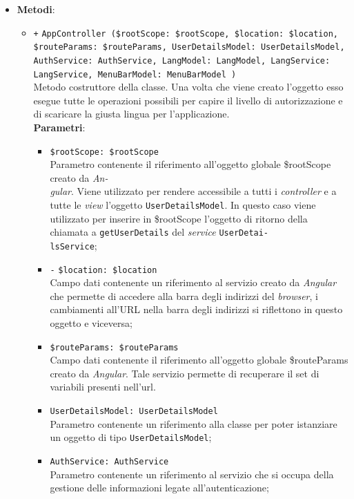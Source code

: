 \begin{itemize}
\begin{itemize}
	\end{itemize}	
		\item \textbf{Metodi}:
		\begin{itemize}
		\item \texttt{+} \texttt{AppController (\$rootScope: \$rootScope, \$location: \$location, \$routeParams: \$routeParams, UserDetailsModel: UserDetailsModel, AuthService: AuthService, LangModel: LangModel, LangService: LangService, MenuBarModel: MenuBarModel )} \\ Metodo costruttore della classe. Una volta che viene creato l'oggetto esso esegue tutte le operazioni possibili per capire il livello di autorizzazione e di scaricare la giusta lingua per l'applicazione.\\
		\textbf{Parametri}: 
		\begin{itemize}
			\item \texttt{\$rootScope: \$rootScope} \\
			Parametro contenente il riferimento all'oggetto globale \$rootScope creato da \textit{An-\\gular{}}. Viene utilizzato per rendere accessibile a tutti i \textit{controller} e a tutte le \textit{view} l'oggetto \texttt{UserDetailsModel}. In questo caso viene utilizzato per inserire in \$rootScope l'oggetto di ritorno della chiamata a \texttt{getUserDetails} del \textit{service} \texttt{UserDetai-\\lsService};
			\item \texttt{-} \texttt{\$location: \$location} \\
			Campo dati contenente un riferimento al servizio creato da \textit{Angular} che permette di accedere alla barra degli indirizzi del \textit{browser}, i cambiamenti all'URL nella barra degli indirizzi si riflettono in questo oggetto e viceversa; 
			\item \texttt{\$routeParams: \$routeParams} \\
			Campo dati contenente il riferimento all'oggetto globale \$routeParams creato da \textit{Angular}. Tale servizio permette di recuperare il set di variabili presenti nell'url.
			\item \texttt{UserDetailsModel: UserDetailsModel} \\
			Parametro contenente un riferimento alla classe per poter istanziare un oggetto di tipo \texttt{UserDetailsModel};
			\item \texttt{AuthService: AuthService} \\
			Parametro contenente un riferimento al servizio che si occupa della gestione delle informazioni legate all’autenticazione;

\end{itemize}
\end{itemize}
\end{itemize}
